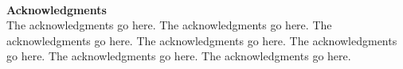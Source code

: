 ~\\[1in] %
\textbf{\Huge Acknowledgments}\\

\noindent 
The acknowledgments go here.
The acknowledgments go here.
The acknowledgments go here.
The acknowledgments go here.
The acknowledgments go here.
The acknowledgments go here.
The acknowledgments go here.
